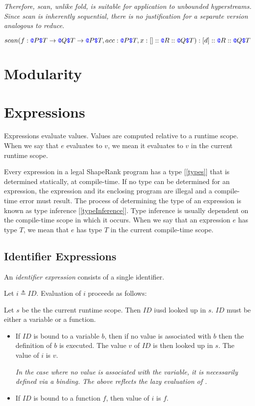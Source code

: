\documentclass{article}
\begin{document}
{\em 
Therefore, scan, unlike fold, is suitable for application to unbounded hyperstreams. Since scan is inherently sequential, there is no justification for a separate version analogous to reduce.
}

$scan(f: \texttt{\color{blue} @}{}P \texttt{\color{blue} \$}{}T \to{} \texttt{\color{blue} @}{}Q \texttt{\color{blue} \$}{}T \to{} \texttt{\color{blue} @}{}P \texttt{\color{blue} \$}{}T, acc: \texttt{\color{blue} @}{}P \texttt{\color{blue} \$}{}T, x:[]::\texttt{\color{blue} @}{}R::\texttt{\color{blue} @}{}Q \texttt{\color{blue} \$}{}T):[d]::\texttt{\color{blue} @}{}R::\texttt{\color{blue} @}{}Q \texttt{\color{blue} \$}{}T$

\section{Modularity}
\label{modularity}




\section{Expressions}
\label{expressions}

Expressions evaluate values. Values are computed relative to a runtime scope. When we say that $e$ evaluates to $v$, we mean it evaluates to $v$ in the current runtime scope. 

Every expression in a legal ShapeRank program has a type [\ref{types}] that is determined statically, at compile-time. If no type can be determined for an expression, the expression and its enclosing program are illegal and a compile-time error must result. The process of determining the type of an expression is known as type inference [\ref{typeInference}]. Type inference  is usually dependent on the compile-time scope in which it occurs. When we say that an expression $e$ has type $T$, we mean that $e$ has type $T$ in the current compile-time scope.

\subsection{Identifier Expressions}
\label{identifierExpressions}

An {\em identifier expression} consists of a single identifier.

\IdentifierExpression{}

Let $i \triangleq ID$.
Evaluation of $i$ proceeds as follows:


Let $s$ be the the current runtime scope. Then $ID$ iusd looked up in $s$. $ID$ must be either a variable or a function.
\begin{itemize}
\item If $ID$ is bound to a variable $b$, then if no value is associated with $b$ then the definition of $b$ is executed. The value $v$ of $ID$ is then looked up in $s$. The value of $i$ is $v$.

{\em In the case where no value is associated with the variable, it is necessarily defined via  a \LET{} binding. The above reflects the lazy evaluation of \LET{}.}

\item If $ID$ is bound to a function $f$, then value of $i$ is $f$. 
\end{itemize}
\end{document}
